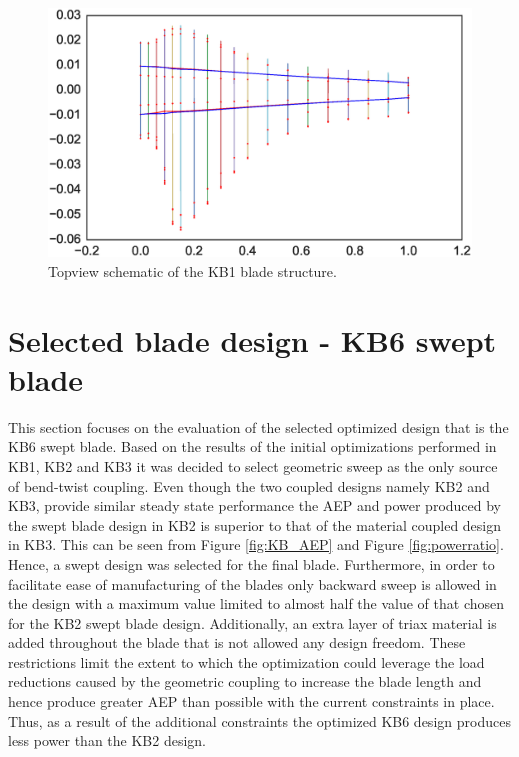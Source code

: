 \begin{figure}[pht]
\begin{center}
	\includegraphics[width=.85\linewidth]{figures/KB1_topview.eps}
\end{center}
\caption{Topview schematic of the KB1 blade structure.}
\label{fig:topview}
\end{figure}

\section{Selected blade design - KB6 swept blade}
\label{sec:final_design}
This section focuses on the evaluation of the selected optimized design that is the KB6 swept blade. Based on the results of the initial optimizations performed in KB1, KB2 and KB3 it was decided to select geometric sweep as the only source of bend-twist coupling. Even though the two coupled designs namely KB2 and KB3, provide similar steady state performance the AEP and power produced by the swept blade design in KB2 is superior to that of the material coupled design in KB3. This can be seen from Figure \ref{fig:KB_AEP} and Figure \ref{fig:powerratio}. Hence, a swept design was selected for the final blade. Furthermore, in order to facilitate ease of manufacturing of the blades only backward sweep is allowed in the design with a maximum value limited to almost half the value of that chosen for the KB2 swept blade design. Additionally, an extra layer of triax material is added throughout the blade that is not allowed any design freedom. These restrictions limit the extent to which the optimization could leverage the load reductions caused by the geometric coupling to increase the blade length and hence produce greater AEP than possible with the current constraints in place. Thus, as a result of the additional constraints the optimized KB6 design produces less power than the KB2 design.

